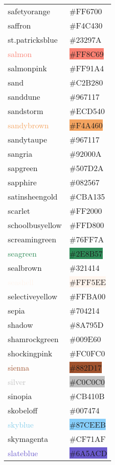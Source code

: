 \documentclass[
]{article}
\begin{document}
\begin{longtable}[]{@{}ll@{}}
\textcolor{safetyorange}{safetyorange} &
\colorbox{safetyorange}{\#FF6700}\tabularnewline
\textcolor{saffron}{saffron} &
\colorbox{saffron}{\#F4C430}\tabularnewline
\textcolor{st.patricksblue}{st.patricksblue} &
\colorbox{st.patricksblue}{\#23297A}\tabularnewline
\textcolor{salmon}{salmon} & \colorbox{salmon}{\#FF8C69}\tabularnewline
\textcolor{salmonpink}{salmonpink} &
\colorbox{salmonpink}{\#FF91A4}\tabularnewline
\textcolor{sand}{sand} &
\colorbox{darkchampagne}{\#C2B280}\tabularnewline
\textcolor{sanddune}{sanddune} &
\colorbox{drab}{\#967117}\tabularnewline
\textcolor{sandstorm}{sandstorm} &
\colorbox{sandstorm}{\#ECD540}\tabularnewline
\textcolor{sandybrown}{sandybrown} &
\colorbox{sandybrown}{\#F4A460}\tabularnewline
\textcolor{sandytaupe}{sandytaupe} &
\colorbox{drab}{\#967117}\tabularnewline
\textcolor{sangria}{sangria} &
\colorbox{sangria}{\#92000A}\tabularnewline
\textcolor{sapgreen}{sapgreen} &
\colorbox{sapgreen}{\#507D2A}\tabularnewline
\textcolor{sapphire}{sapphire} &
\colorbox{sapphire}{\#082567}\tabularnewline
\textcolor{satinsheengold}{satinsheengold} &
\colorbox{satinsheengold}{\#CBA135}\tabularnewline
\textcolor{scarlet}{scarlet} &
\colorbox{scarlet}{\#FF2000}\tabularnewline
\textcolor{schoolbusyellow}{schoolbusyellow} &
\colorbox{schoolbusyellow}{\#FFD800}\tabularnewline
\textcolor{screamingreen}{screamingreen} &
\colorbox{screamingreen}{\#76FF7A}\tabularnewline
\textcolor{seagreen}{seagreen} &
\colorbox{seagreen}{\#2E8B57}\tabularnewline
\textcolor{sealbrown}{sealbrown} &
\colorbox{sealbrown}{\#321414}\tabularnewline
\textcolor{seashell}{seashell} &
\colorbox{seashell}{\#FFF5EE}\tabularnewline
\textcolor{selectiveyellow}{selectiveyellow} &
\colorbox{selectiveyellow}{\#FFBA00}\tabularnewline
\textcolor{sepia}{sepia} & \colorbox{sepia}{\#704214}\tabularnewline
\textcolor{shadow}{shadow} & \colorbox{shadow}{\#8A795D}\tabularnewline
\textcolor{shamrockgreen}{shamrockgreen} &
\colorbox{shamrockgreen}{\#009E60}\tabularnewline
\textcolor{shockingpink}{shockingpink} &
\colorbox{shockingpink}{\#FC0FC0}\tabularnewline
\textcolor{sienna}{sienna} & \colorbox{sienna}{\#882D17}\tabularnewline
\textcolor{silver}{silver} & \colorbox{silver}{\#C0C0C0}\tabularnewline
\textcolor{sinopia}{sinopia} &
\colorbox{sinopia}{\#CB410B}\tabularnewline
\textcolor{skobeloff}{skobeloff} &
\colorbox{skobeloff}{\#007474}\tabularnewline
\textcolor{skyblue}{skyblue} &
\colorbox{lightskyblue}{\#87CEEB}\tabularnewline
\textcolor{skymagenta}{skymagenta} &
\colorbox{skymagenta}{\#CF71AF}\tabularnewline
\textcolor{slateblue}{slateblue} &
\colorbox{slateblue}{\#6A5ACD}\tabularnewline

\end{longtable}
\end{document}
